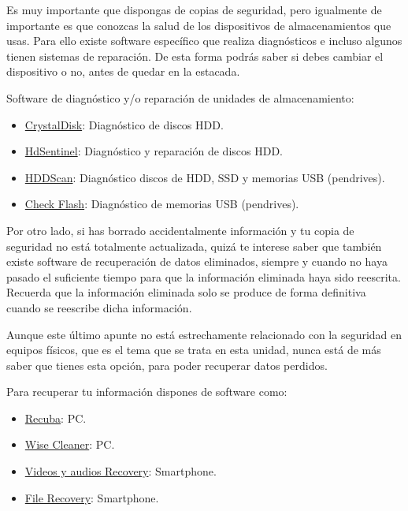 \documentclass[
  a4paper,
  openany]{book}
\begin{document}
Es muy importante que dispongas de copias de seguridad, pero igualmente de importante es que conozcas la salud de los dispositivos de almacenamientos que usas. Para ello existe software específico que realiza diagnósticos e incluso algunos tienen sistemas de reparación. De esta forma podrás saber si debes cambiar el dispositivo o no, antes de quedar en la estacada.

Software de diagnóstico y/o reparación de unidades de almacenamiento:

\begin{itemize}
\item
  \href{https://crystalmark.info/en/software/crystaldiskinfo/}{CrystalDisk}: Diagnóstico de discos HDD.
\item
  \href{https://www.hdsentinel.com/}{HdSentinel}: Diagnóstico y reparación de discos HDD.
\item
  \href{https://hddscan.com/}{HDDScan}: Diagnóstico discos de HDD, SSD y memorias USB (pendrives).
\item
  \href{http://mikelab.kiev.ua/index_en.php?page=PROGRAMS/chkflsh_en}{Check Flash}: Diagnóstico de memorias USB (pendrives).
\end{itemize}

Por otro lado, si has borrado accidentalmente información y tu copia de seguridad no está totalmente actualizada, quizá te interese saber que también existe software de recuperación de datos eliminados, siempre y cuando no haya pasado el suficiente tiempo para que la información eliminada haya sido reescrita. Recuerda que la información eliminada solo se produce de forma definitiva cuando se reescribe dicha información.

Aunque este último apunte no está estrechamente relacionado con la seguridad en equipos físicos, que es el tema que se trata en esta unidad, nunca está de más saber que tienes esta opción, para poder recuperar datos perdidos.

Para recuperar tu información dispones de software como:

\begin{itemize}
\item
  \href{https://www.ccleaner.com/recuva}{Recuba}: PC.
\item
  \href{https://www.wisecleaner.com/wise-data-recovery.html}{Wise Cleaner}: PC.
\item
  \href{https://play.google.com/store/apps/details?id=com.mediarecovery.deletedvideorecovery.deletedaudiorecovery\&hl=es}{Videos y audios Recovery}: Smartphone.
\item
  \href{https://play.google.com/store/apps/details?id=com.file.recovery.data.recovery.deletedfilerecovery}{File Recovery}: Smartphone.
\end{itemize}
\end{document}
